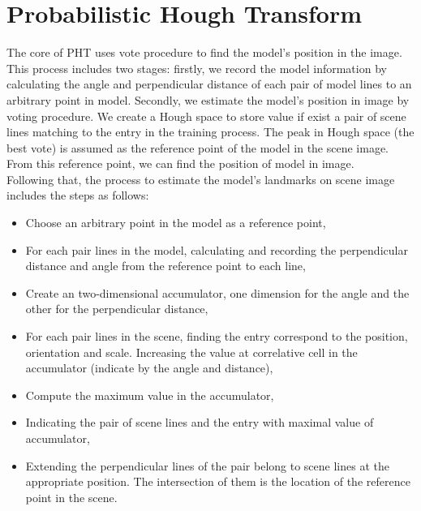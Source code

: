 \section{Probabilistic Hough Transform}
The core of PHT uses vote procedure to find the model's position in the image. This process includes two stages: firstly, we record the model information by calculating the angle and perpendicular distance of each pair of model lines to an arbitrary point in model. Secondly, we estimate the model's position in image by voting procedure. We create a Hough space to store value if exist a pair of scene lines matching to the entry in the training process. The peak in Hough space (the best vote) is assumed as the reference point of the model in the scene image. From this reference point, we can find the position of model in image.\\
Following that, the process to estimate the model's landmarks on scene image includes the steps as follows:
\begin{itemize}
\item Choose an arbitrary point in the model as a reference point,
\item For each pair lines in the model, calculating and recording the perpendicular distance and angle from the reference point to each line,
\item Create an two-dimensional accumulator, one dimension for the angle and the other for the perpendicular distance,
\item For each pair lines in the scene, finding the entry correspond to the position, orientation and scale. Increasing the value at correlative cell in the accumulator (indicate by the angle and distance),
\item Compute the maximum value in the accumulator,
\item Indicating the pair of scene lines and the entry with maximal value of accumulator,
\item Extending the perpendicular lines of the pair belong to scene lines at the appropriate position. The intersection of them is the location of the reference point in the scene.
\end{itemize}
